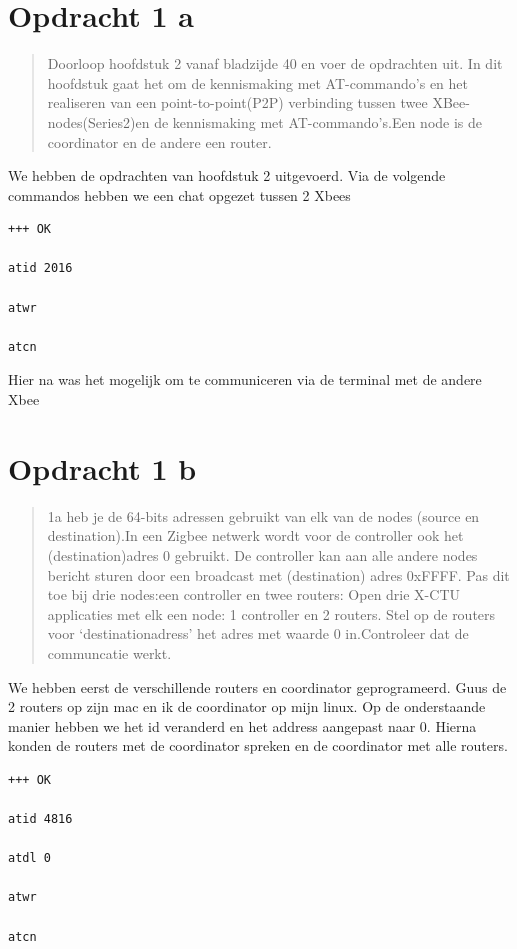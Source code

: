 \documentclass[12pt]{article}
\begin{document}
\clearpage

{}
\section*{Opdracht 1 a}
\begin{quote}
Doorloop hoofdstuk 2 vanaf bladzijde 40 en voer de opdrachten uit. In dit hoofdstuk gaat het om de kennismaking met AT-commando’s en het realiseren van een point-to-point(P2P) verbinding tussen twee XBee-nodes(Series2)en de kennismaking met AT-commando’s.Een node is de coordinator en de andere een router.
\end{quote}
We hebben de opdrachten van hoofdstuk 2 uitgevoerd. Via de volgende commandos hebben we een chat opgezet tussen 2 Xbees
\begin{lstlisting}
+++ OK

atid 2016

atwr

atcn
\end{lstlisting}
Hier na was het mogelijk om te communiceren via de terminal met de andere Xbee
\newpage
\section*{Opdracht 1 b}
\begin{quote}
1a heb je de 64-bits adressen gebruikt van elk van de nodes (source en destination).In een Zigbee netwerk wordt voor de controller ook het (destination)adres 0 gebruikt.
De controller kan aan alle andere nodes bericht sturen door een broadcast met (destination) adres 0xFFFF. Pas dit toe bij drie nodes:een controller en twee routers: Open drie X-CTU applicaties met elk een node: 1 controller en 2 routers. Stel op de routers voor ‘destinationadress’ het adres met waarde 0 in.Controleer dat de communcatie werkt.
\end{quote}
We hebben eerst de verschillende routers en coordinator geprogrameerd. Guus de 2 routers op zijn mac en ik de coordinator op mijn linux. Op de onderstaande manier hebben we het id veranderd en het address aangepast naar 0. Hierna konden de routers met de coordinator spreken en de coordinator met alle routers.
\begin{lstlisting}
+++ OK

atid 4816

atdl 0

atwr

atcn
\end{lstlisting}	
\newpage
\end{document}

